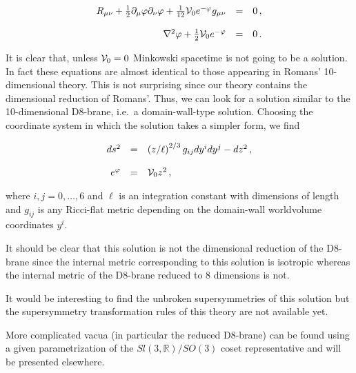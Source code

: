 \documentclass[12pt,a4paper]{article}
\begin{document}
\begin{equation}
\begin{array}{rcl}
R_{\mu\nu} +\frac{1}{2}\partial_{\mu}\varphi\partial_{\nu}\varphi
+\frac{1}{12}{\cal V}_{0}e^{-\varphi}g_{\mu\nu} & = & 0\, ,\\
& & \\
\nabla^{2}\varphi+\frac{1}{2}{\cal V}_{0}e^{-\varphi} & = & 0\, .\\
\end{array}
\end{equation}

It is clear that, unless ${\cal V}_{0}=0$ Minkowski spacetime is not
going to be a solution. In fact these equations are almost identical
to those appearing in Romans' 10-dimensional theory. This is not
surprising since our theory contains the dimensional reduction of
Romans'. Thus, we can look for a solution similar to the
10-dimensional D8-brane, i.e.~a domain-wall-type solution.  Choosing
the coordinate system in which the solution takes a simpler form, we
find

\begin{equation}
  \begin{array}{rcl}
ds^{2} & = & \left(z/\ell \right)^{2/3} g_{ij}dy^{i}dy^{j}-dz^{2}\, ,\\
& & \\
e^{\varphi} & = & {\cal V}_{0}  z^{2}\, ,\\
\end{array}
\end{equation}

\noindent where $i,j=0,\ldots,6$ and $\ell$ is an integration constant 
with dimensions of length and $g_{ij}$ is any Ricci-flat metric
depending on the domain-wall worldvolume coordinates $y^{i}$.

It should be clear that this solution is not the dimensional reduction
of the D8-brane since the internal metric corresponding to this
solution is isotropic whereas the internal metric of the D8-brane reduced
to 8 dimensions is not.

It would be interesting to find the unbroken supersymmetries of this
solution but the supersymmetry transformation rules of this theory are
not available yet.

More complicated vacua (in particular the reduced D8-brane) can be
found using a given parametrization of the $Sl(3,\mathbb{R})/SO(3)$
coset representative and will be presented elsewhere.

\end{document}
